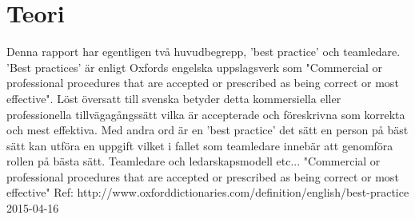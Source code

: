 \section{Teori}
Denna rapport har egentligen två huvudbegrepp, 'best practice' och teamledare. 'Best practices' är enligt Oxfords engelska uppslagsverk som "Commercial or professional procedures that are accepted or prescribed as being correct or most effective". Löst översatt till svenska betyder detta kommersiella eller professionella tillvägagångssätt vilka är accepterade och föreskrivna som korrekta och mest effektiva. Med andra ord är en 'best practice' det sätt en person på bäst sätt kan utföra en uppgift vilket i fallet som teamledare innebär att genomföra rollen på bästa sätt. 
\newline \newline
Teamledare och ledarskapsmodell etc...
"Commercial or professional procedures that are accepted or prescribed as being correct or most effective"
\newline \newline
Ref: http://www.oxforddictionaries.com/definition/english/best-practice 2015-04-16